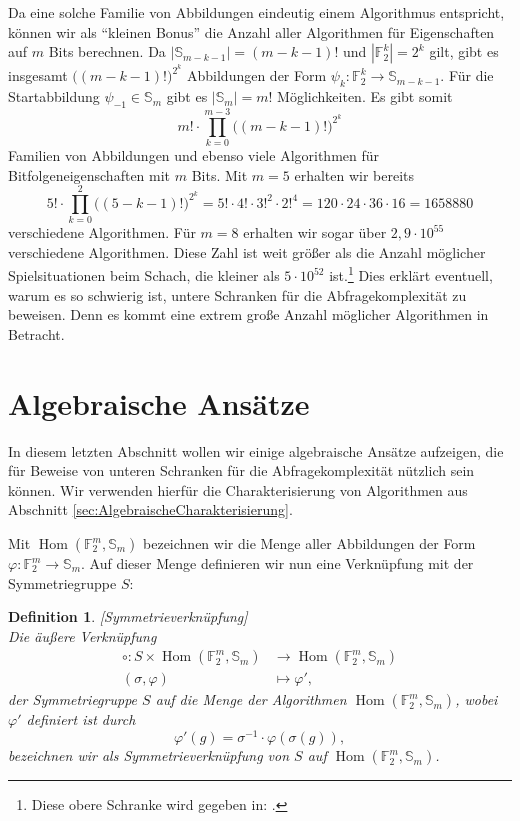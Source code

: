 \documentclass[10pt,a4paper, footheight=1mm]{scrreprt}
\newtheorem{definition}{Definition}
\theoremstyle{definition}
\DeclareMathOperator\Hom{Hom}
\begin{document}
Da eine solche Familie von Abbildungen eindeutig
einem Algorithmus entspricht, können wir als "`kleinen Bonus"'
die Anzahl aller Algorithmen für Eigenschaften auf $m$ Bits
berechnen. Da $|\mathbb{S}_{m-k-1}|=(m-k-1)!$ und
$|\mathbb{F}_2^k| = 2^k$ gilt, gibt es
insgesamt $\big((m-k-1)!\big)^{2^k}$ Abbildungen der Form
$\psi_k:\mathbb{F}_2^k \to \mathbb{S}_{m-k-1}$.
Für die Startabbildung $\psi_{-1}\in\mathbb{S}_m$ gibt
es $|\mathbb{S}_m| = m!$ Möglichkeiten.
Es gibt somit
$$m!\cdot \prod_{k=0}^{m-3} \big((m-k-1)!\big)^{2^k} $$
Familien von Abbildungen und ebenso viele Algorithmen
für Bitfolgeneigenschaften mit $m$ Bits.
Mit $m=5$ erhalten wir bereits 
$$5!\cdot \prod_{k=0}^2 \big((5-k-1)!\big)^{2^k}
= 5!\cdot 4! \cdot 3!^2 \cdot 2!^4
= 120 \cdot 24 \cdot 36 \cdot 16 = 1658880
$$
verschiedene Algorithmen. Für $m=8$ erhalten wir sogar
über $2,9 \cdot 10^{55}$ verschiedene Algorithmen. Diese
Zahl ist weit größer als die Anzahl möglicher 
Spielsituationen beim Schach, die kleiner als $5\cdot 10^{52}$
ist.\footnote{Diese obere Schranke wird gegeben in:
\cite[S.172]{Allis}.}
Dies erklärt eventuell, warum es so schwierig ist, untere
Schranken für die Abfragekomplexität zu beweisen. Denn
es kommt eine extrem große Anzahl möglicher Algorithmen
in Betracht.

\section{Algebraische Ansätze}
\label{sec:AlgebraischeAnsaetze}
In diesem letzten Abschnitt wollen wir einige algebraische
Ansätze aufzeigen, die für Beweise von unteren
Schranken für die Abfragekomplexität nützlich sein können.
Wir verwenden hierfür die Charakterisierung von Algorithmen
aus Abschnitt \ref{sec:AlgebraischeCharakterisierung}.

Mit $\Hom(\mathbb{F}_2^m, \mathbb{S}_m)$ bezeichnen wir die
Menge aller Abbildungen der Form 
$\varphi: \mathbb{F}_2^m \to \mathbb{S}_m$.
Auf dieser Menge definieren wir nun eine Verknüpfung
mit der Symmetriegruppe $S$:

\begin{definition}
\label{def:Symmetrieverknuepfung}
[Symmetrieverknüpfung]
\ \\
Die äußere Verknüpfung
\begin{align*} 
\circ: S \times \Hom(\mathbb{F}_2^m, \mathbb{S}_m) &\to 
\Hom(\mathbb{F}_2^m, \mathbb{S}_m) \\
(\sigma, \varphi) &\mapsto \varphi',
\end{align*}
der Symmetriegruppe $S$ auf die Menge der Algorithmen 
$\Hom(\mathbb{F}_2^m, \mathbb{S}_m)$, wobei $\varphi'$ definiert ist durch 
$$\varphi'(g)=\sigma^{-1} \cdot \varphi(\sigma(g)),$$
bezeichnen wir als \emph{Symmetrieverknüpfung} von
$S$ auf  $\Hom(\mathbb{F}_2^m, \mathbb{S}_m)$.
\end{definition}
\end{document}

